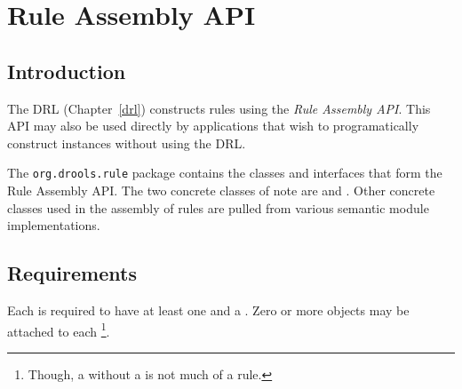 \chapter{Rule Assembly API}
\label{rule.assembly}

\section{Introduction}

The DRL (Chapter~\vref{drl}) constructs rules using the
\emph{Rule Assembly API}.  This API may also be used
directly by applications that wish to programatically construct
 instances without using the DRL.

The \texttt{org.drools.rule} package contains the classes
and interfaces that form the Rule Assembly API.  The two concrete
classes of note are  and .
Other concrete classes used in the assembly of rules are
pulled from various semantic module implementations.

\section{Requirements}

Each  is required to have at least one
 and a .
Zero or more  objects may be attached
to each \footnote{Though, a  without a
 is not much of a rule.}.
